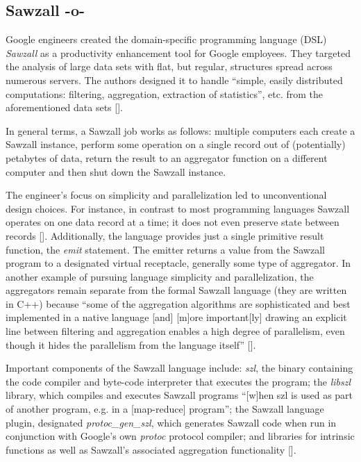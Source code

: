 \subsection{Sawzall -o-}

Google engineers created the domain-specific programming language
(DSL) \textit{Sawzall} as a productivity enhancement tool for Google
employees.  They targeted the analysis of large data sets with flat,
but regular, structures spread across numerous servers.  The authors
designed it to handle ``simple, easily distributed computations:
filtering, aggregation, extraction of statistics'', etc. from the
aforementioned data sets [\cite{pike05sawzall}].

In general terms, a Sawzall job works as follows: multiple computers
each create a Sawzall instance, perform some operation on a single
record out of (potentially) petabytes of data, return the result to an
aggregator function on a different computer and then shut down the
Sawzall instance.

The engineer's focus on simplicity and parallelization led to
unconventional design choices.  For instance, in contrast to most
programming languages Sawzall operates on one data record at a time;
it does not even preserve state between records
[\cite{www-bytemining-sawzall}]. Additionally, the language provides
just a single primitive result function, the \textit{emit} statement.
The emitter returns a value from the Sawzall program to a designated
virtual receptacle, generally some type of aggregator.  In another
example of pursuing language simplicity and parallelization, the
aggregators remain separate from the formal Sawzall language (they are
written in C++) because ``some of the aggregation algorithms are
sophisticated and best implemented in a native language [and] [m]ore
important[ly] drawing an explicit line between filtering and
aggregation enables a high degree of parallelism, even though it hides
the parallelism from the language itself'' [\cite{pike05sawzall}].

Important components of the Sawzall language include: \textit{szl},
the binary containing the code compiler and byte-code interpreter that
executes the program; the \textit{libszl} library, which compiles and
executes Sawzall programs ``[w]hen szl is used as part of another
program, e.g. in a [map-reduce] program''; the Sawzall language
plugin, designated \textit{protoc\_gen\_szl}, which generates Sawzall
code when run in conjunction with Google's own \textit{protoc}
protocol compiler; and libraries for intrinsic functions as well as
Sawzall's associated aggregation functionality
[\cite{www-google-code-wiki-sawzall}].



